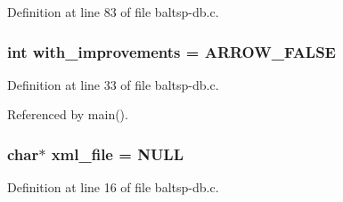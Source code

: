 Definition at line 83 of file baltsp-db.c.\hypertarget{bin_2baltsp-db_8c_91079460b00ac08193d5ee47094f8f70}{
\subsubsection[{with\_\-improvements}]{\setlength{\rightskip}{0pt plus 5cm}int {\bf with\_\-improvements} = ARROW\_\-FALSE}}
\label{bin_2baltsp-db_8c_91079460b00ac08193d5ee47094f8f70}




Definition at line 33 of file baltsp-db.c.

Referenced by main().\hypertarget{bin_2baltsp-db_8c_bf4e392494984c6ef8259268eb1fe421}{
\subsubsection[{xml\_\-file}]{\setlength{\rightskip}{0pt plus 5cm}char$\ast$ {\bf xml\_\-file} = NULL}}
\label{bin_2baltsp-db_8c_bf4e392494984c6ef8259268eb1fe421}




Definition at line 16 of file baltsp-db.c.